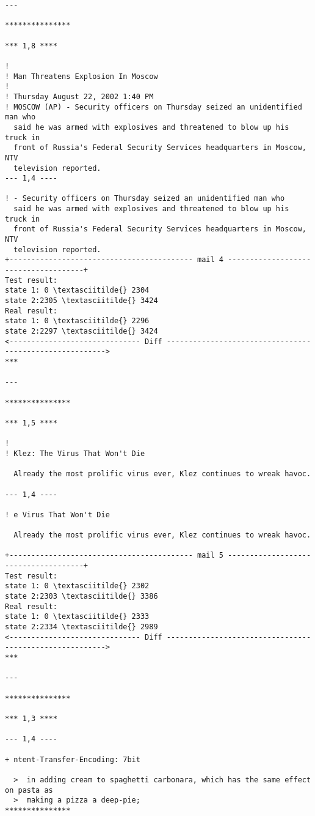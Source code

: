 \documentclass[11pt]{article}
\begin{document}
\begin{Verbatim}[commandchars=\\\{\}]
--- 

***************

*** 1,8 ****

! 
! Man Threatens Explosion In Moscow 
! 
! Thursday August 22, 2002 1:40 PM
! MOSCOW (AP) - Security officers on Thursday seized an unidentified man who
  said he was armed with explosives and threatened to blow up his truck in
  front of Russia's Federal Security Services headquarters in Moscow, NTV
  television reported.
--- 1,4 ----

! - Security officers on Thursday seized an unidentified man who
  said he was armed with explosives and threatened to blow up his truck in
  front of Russia's Federal Security Services headquarters in Moscow, NTV
  television reported.
+------------------------------------------ mail 4 -------------------------------------+
Test result:
state 1: 0 \textasciitilde{} 2304
state 2:2305 \textasciitilde{} 3424
Real result:
state 1: 0 \textasciitilde{} 2296
state 2:2297 \textasciitilde{} 3424
<------------------------------ Diff -------------------------------------------------------->
*** 

--- 

***************

*** 1,5 ****

! 
! Klez: The Virus That Won't Die
   
  Already the most prolific virus ever, Klez continues to wreak havoc.
  
--- 1,4 ----

! e Virus That Won't Die
   
  Already the most prolific virus ever, Klez continues to wreak havoc.
  
+------------------------------------------ mail 5 -------------------------------------+
Test result:
state 1: 0 \textasciitilde{} 2302
state 2:2303 \textasciitilde{} 3386
Real result:
state 1: 0 \textasciitilde{} 2333
state 2:2334 \textasciitilde{} 2989
<------------------------------ Diff -------------------------------------------------------->
*** 

--- 

***************

*** 1,3 ****

--- 1,4 ----

+ ntent-Transfer-Encoding: 7bit
  
  >  in adding cream to spaghetti carbonara, which has the same effect on pasta as
  >  making a pizza a deep-pie; 
***************


\end{Verbatim}
\end{document}

